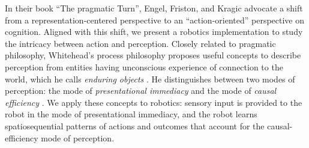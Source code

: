 \documentclass[runningheads]{llncs}
\begin{document}

In their book ``The pragmatic Turn'', Engel, Friston, and Kragic \cite{engel_pragmatic_2015} advocate a shift from a representation-centered perspective to an ``action-oriented'' perspective on cognition.  
Aligned with this shift, we present a robotics implementation to study the intricacy between action and perception.
Closely related to pragmatic philosophy, Whitehead's process philosophy proposes useful concepts to describe perception from entities 
having unconscious experience of connection to the world,
which he calls \textit{enduring objects} \cite{whitehead1929}. 
He distinguishes between two modes of perception: the mode of \textit{presentational immediacy} and the mode of \textit{causal efficiency} \cite{smith_social_2010}. 
We apply these concepts to robotics: sensory input is provided to the robot in the mode of presentational immediacy, and the robot learns spatiosequential patterns of actions and outcomes that account for the causal-efficiency mode of perception. 

\end{document}
